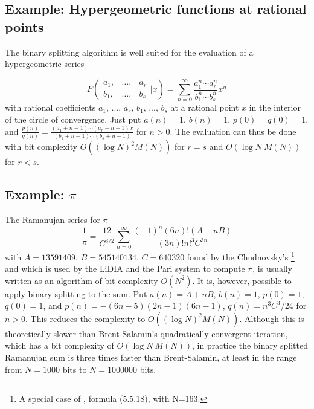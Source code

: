 \subsection{Example: Hypergeometric functions at rational points}

The binary splitting algorithm is well suited for the evaluation of a
hypergeometric series 

\[
F\left( \begin{array}{ccc}
a_{1}, & \ldots , & a_{r}\\
b_{1}, & \ldots , & b_{s}
\end{array}
\big| x\right) =\sum ^{\infty }_{n=0}
\frac{a_{1}^{\overline{n}}\cdots 
a_{r}^{\overline{n}}}{b_{1}^{\overline{n}}\cdots b_{s}^{\overline{n}}}x^{n}\]
with rational coefficients  \( a_{1} \), ...,  \( a_{r} \),  \( b_{1} \),
...,  \( b_{s} \) at a rational point  \( x \) in the interior of the circle of
convergence. Just put  \( a(n)=1 \),  \( b(n)=1 \),  \( p(0)=q(0)=1 \), and
\( \frac{p(n)}{q(n)}=\frac{(a_{1}+n-1)\cdots 
(a_{r}+n-1)x}{(b_{1}+n-1)\cdots (b_{s}+n-1)} \) for  \( n>0 \). The evaluation 
can thus be done with
bit complexity  \( O((\log N)^{2}M(N)) \) for  
\( r=s \) and  \( O(\log N\: M(N)) \) for  \( r<s \).

\subsection{Example:  \( \pi  \)}

The Ramanujan series for  \( \pi  \) 
\[
\frac{1}{\pi }=\frac{12}{C^{3/2}}\sum^{\infty }_{n=0}
\frac{(-1)^n(6n)!(A+nB)}{(3n)!n!^{3}C^{3n}}\]
with  \( A=13591409 \),  \( B=545140134 \), \( C=640320 \) found by the
Chudnovsky's \footnote{A special case of \cite{87}, formula (5.5.18),
with N=163.} and which is used by the {\sf LiDIA} \cite{95,97,97b} and the Pari
\cite{95b} system to compute \( \pi \), is usually written as an algorithm
of bit complexity  \( O(N^{2}) \). It is, however, possible to apply
binary splitting to the sum. Put \( a(n)=A+nB \),  \( b(n)=1 \),
\( p(0)=1 \),  \( q(0)=1 \), and \( p(n)=-(6n-5)(2n-1)(6n-1) \),
\( q(n)=n^{3}C^3/24 \) for  \( n>0 \).  This reduces the complexity to 
\( O((\log N)^{2}M(N)) \). Although this is theoretically slower than
Brent-Salamin's quadratically convergent iteration, which has a bit
complexity of  \( O(\log N\: M(N)) \), in practice the binary splitted
Ramanujan sum is three times faster than Brent-Salamin, at least in the
range from  \( N=1000 \) bits to \( N=1000000 \) bits.


